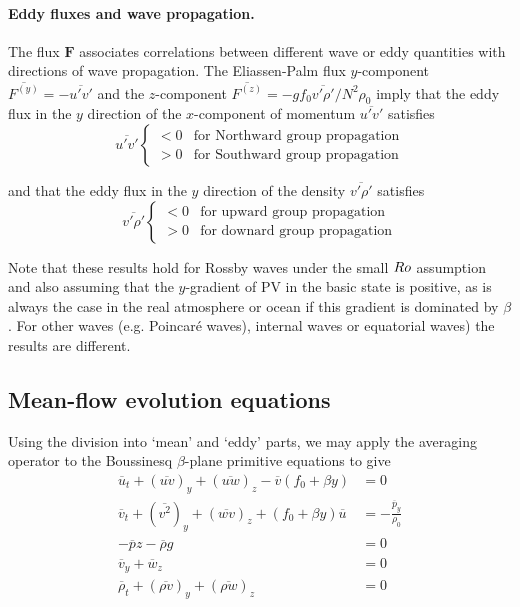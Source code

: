 \documentclass{jknotes}
\begin{document}
\paragraph{Eddy fluxes and wave propagation.} The flux $\symbf{F}$ associates
correlations between different wave or eddy quantities with directions of wave
propagation. The Eliassen-Palm flux $y$-component $\overline{F^{(y)}} =
-\overline{u'v'}$ and the $z$-component $\overline{F^{(z)}} = -g f_0
\overline{v'\rho'}/N^2 \rho_0$ imply that the eddy flux in the $y$ direction
of the $x$-component of momentum $\overline{u'v'}$ satisfies
\begin{equation}
	\overline{u'v'} \begin{cases} < 0 & \text{for Northward group propagation}
		\\ > 0 & \text{for Southward group propagation}\end{cases}
\end{equation}

and that the eddy flux in the $y$ direction of the density
$\overline{v'\rho'}$ satisfies
\begin{equation}
	\overline{v'\rho'} \begin{cases}
		< 0 & \text{for upward group propagation} \\
		> 0 & \text{for downard group propagation}
	\end{cases}
\end{equation}

Note that these results hold for Rossby waves under the small $Ro$ assumption
and also assuming that the $y$-gradient of PV in the basic state is positive,
as is always the case in the real atmosphere or ocean if this gradient is
dominated by $\beta$. For other waves (e.g. Poincar\'{e} waves), internal
waves or equatorial waves) the results are different.

\subsection{Mean-flow evolution equations}
Using the division into `mean' and `eddy' parts, we may apply the averaging
operator to the Boussinesq $\beta$-plane primitive equations to give
\begin{align}
	\overline{u}_t + (\overline{uv})_y + (\overline{uw})_z
	-\overline{v}(f_0+\beta y) &= 0 \\
	\overline{v}_t + (\overline{v^2})_y + (\overline{wv})_z + (f_0 + \beta y)
	\overline{u} &= -\frac{\overline{p}_y}{\rho_0} \\
	-\overline{p}z - \overline{\rho} g &= 0 \\
	\overline{v}_y + \overline{w}_z &= 0 \label{eq:13.6}\\
	\overline{\rho}_t + (\overline{\rho v})_y + (\overline{\rho w})_z &= 0
\end{align}
\end{document}
